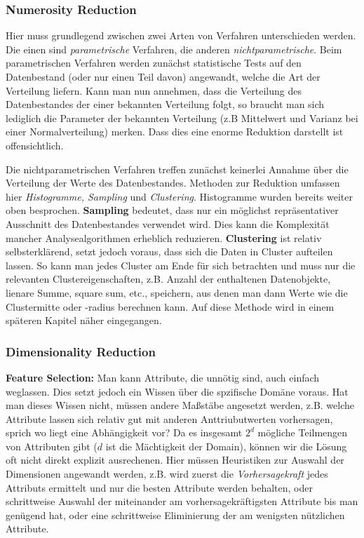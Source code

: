 \subsubsection{Numerosity Reduction}
Hier muss grundlegend zwischen zwei Arten von Verfahren unterschieden werden. Die
einen sind \textit{parametrische} Verfahren, die anderen \textit{nichtparametrische}.
Beim parametrischen Verfahren werden zunächst statistische Tests auf den Datenbestand
(oder nur einen Teil davon) angewandt, welche die Art der Verteilung liefern. Kann
man nun annehmen, dass die Verteilung des Datenbestandes der einer bekannten Verteilung
folgt, so braucht man sich lediglich die Parameter der bekannten Verteilung (z.B 
Mittelwert und Varianz bei einer Normalverteilung) merken. Dass dies eine enorme
Reduktion darstellt ist offensichtlich.

Die nichtparametrischen Verfahren treffen zunächst keinerlei Annahme über die
Verteilung der Werte des Datenbestandes. Methoden zur Reduktion umfassen hier
\textit{Histogramme, Sampling} und \textit{Clustering}. Histogramme wurden bereits
weiter oben besprochen. \textbf{Sampling} bedeutet, dass nur ein möglichst 
repräsentativer Ausschnitt des Datenbestandes verwendet wird. Dies kann die 
Komplexität mancher Analysealgorithmen erheblich reduzieren. \textbf{Clustering}
ist relativ selbsterklärend, setzt jedoch voraus, dass sich die Daten in Cluster
aufteilen lassen. So kann man jedes Cluster am Ende für sich betrachten und muss
nur die relevanten Clustereigenschaften, z.B. Anzahl der enthaltenen Datenobjekte,
lienare Summe, square sum, etc., speichern, aus denen man dann Werte wie die
Clustermitte oder -radius berechnen kann. Auf diese Methode wird in einem späteren
Kapitel näher eingegangen.

\subsubsection{Dimensionality Reduction}
\textbf{Feature Selection:} Man kann Attribute, die unnötig sind, auch einfach
weglassen. Dies setzt jedoch ein Wissen über die spzifische Domäne voraus. Hat
man dieses Wissen nicht, müssen andere Maßstäbe angesetzt werden, z.B. welche 
Attribute lassen sich relativ gut mit anderen Anttriubutwerten vorhersagen,
sprich wo liegt eine Abhängigkeit vor? Da es insgesamt \(2^d\) mögliche
Teilmengen von Attributen gibt (\(d\) ist die Mächtigkeit der Domain), 
können wir die Lösung oft nicht direkt explizit ausrechenen. Hier
müssen Heuristiken zur Auswahl der Dimensionen angewandt werden, z.B. wird zuerst die
\textit{Vorhersagekraft} jedes Attributs ermittelt und nur die besten Attribute
werden behalten, oder schrittweise Auswahl der miteinander am vorhersagekräftigsten
Attribute bis man genügend hat, oder eine schrittweise Eliminierung der am
wenigsten nützlichen Attribute.

